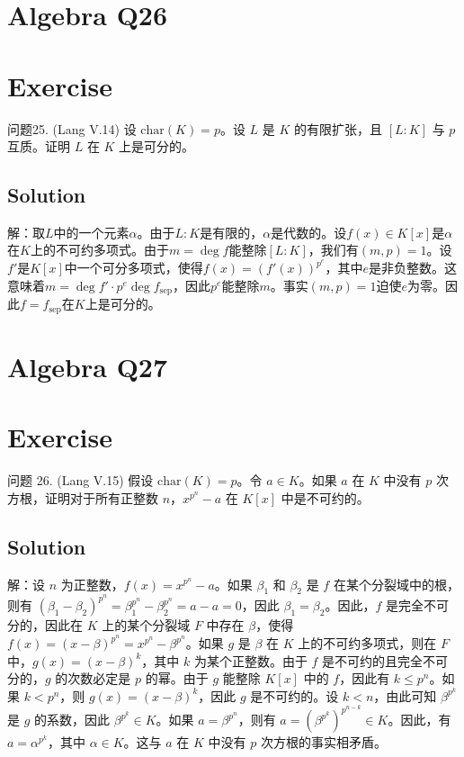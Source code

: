 \documentclass[12pt]{book}
\begin{document}
\section{Algebra Q26}
\section*{Exercise}
问题25. (Lang V.14) 设 $\text{char}(K) = p$。设 $L$ 是 $K$ 的有限扩张，且 $[L : K]$ 与 $p$ 互质。证明 $L$ 在 $K$ 上是可分的。



\subsection*{Solution}
解：取$L$中的一个元素$\alpha$。由于$L : K$是有限的，$\alpha$是代数的。设$f(x) \in K[x]$是$\alpha$在$K$上的不可约多项式。由于$m = \deg f$能整除$[L : K]$，我们有$(m, p) = 1$。设$f'$是$K[x]$中一个可分多项式，使得$f(x) = (f'(x))^{p^e}$，其中$e$是非负整数。这意味着$m = \deg f' \cdot p^e \deg f_{\text{sep}}$，因此$p^e$能整除$m$。事实$(m, p) = 1$迫使$e$为零。因此$f = f_{\text{sep}}$在$K$上是可分的。
\newpage
\section{Algebra Q27}
\section*{Exercise}
问题 26. (Lang V.15) 假设 $\text{char}(K) = p$。令 $a \in K$。如果 $a$ 在 $K$ 中没有 $p$ 次方根，证明对于所有正整数 $n$，$x^{p^n} - a$ 在 $K[x]$ 中是不可约的。



\subsection*{Solution}
解：设 $n$ 为正整数，$f(x) = x^{p^n} - a$。如果 $\beta_1$ 和 $\beta_2$ 是 $f$ 在某个分裂域中的根，则有 $(\beta_1 - \beta_2)^{p^n} = \beta_1^{p^n} - \beta_2^{p^n} = a - a = 0$，因此 $\beta_1 = \beta_2$。因此，$f$ 是完全不可分的，因此在 $K$ 上的某个分裂域 $F$ 中存在 $\beta$，使得 $f(x) = (x - \beta)^{p^n} = x^{p^n} - \beta^{p^n}$。如果 $g$ 是 $\beta$ 在 $K$ 上的不可约多项式，则在 $F$ 中，$g(x) = (x - \beta)^k$，其中 $k$ 为某个正整数。由于 $f$ 是不可约的且完全不可分的，$g$ 的次数必定是 $p$ 的幂。由于 $g$ 能整除 $K[x]$ 中的 $f$，因此有 $k \le p^n$。如果 $k < p^n$，则 $g(x) = (x - \beta)^k$，因此 $g$ 是不可约的。设 $k < n$，由此可知 $\beta^{p^k}$ 是 $g$ 的系数，因此 $\beta^{p^k} \in K$。如果 $a = \beta^{p^n}$，则有 $a = (\beta^{p^k})^{p^{n-k}} \in K$。因此，有 $a = \alpha^{p^k}$，其中 $\alpha \in K$。这与 $a$ 在 $K$ 中没有 $p$ 次方根的事实相矛盾。
\newpage
\end{document}
